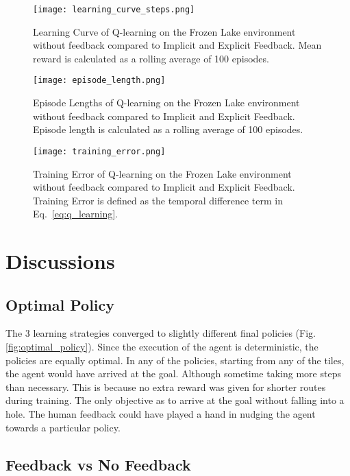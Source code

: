 \documentclass[conference]{IEEEtran}
\begin{document}
\begin{figure}
    \centering
    \texttt{[image: learning\_curve\_steps.png]}
    \caption{Learning Curve of Q-learning on the Frozen Lake environment without feedback compared to Implicit and Explicit Feedback. Mean reward is calculated as a rolling average of 100 episodes.}
    \label{fig:learning_curve_steps}
\end{figure}

\begin{figure}
    \centering
    \texttt{[image: episode\_length.png]}
    \caption{Episode Lengths of Q-learning on the Frozen Lake environment without feedback compared to Implicit and Explicit Feedback. Episode length is calculated as a rolling average of 100 episodes.}
    \label{fig:episode_length}
\end{figure}

\begin{figure}
    \centering
    \texttt{[image: training\_error.png]}
    \caption{Training Error of Q-learning on the Frozen Lake environment without feedback compared to Implicit and Explicit Feedback. Training Error is defined as the temporal difference term in Eq.~\ref{eq:q_learning}.}
    \label{fig:training_error}
\end{figure}

\section{Discussions}

\subsection{Optimal Policy}

The 3 learning strategies converged to slightly different final policies (Fig.\ref{fig:optimal_policy}). Since the execution of the agent is deterministic, the policies are equally optimal. In any of the policies, starting from any of the tiles, the agent would have arrived at the goal. Although sometime taking more steps than necessary. This is because no extra reward was given for shorter routes during training. The only objective as to arrive at the goal without falling into a hole. The human feedback could have played a hand in nudging the agent towards a particular policy.

\subsection{Feedback vs No Feedback}
\end{document}
